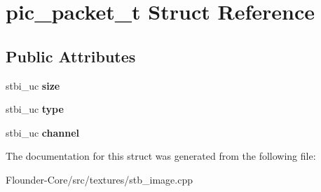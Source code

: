 \hypertarget{structpic__packet__t}{}\section{pic\+\_\+packet\+\_\+t Struct Reference}
\label{structpic__packet__t}
\subsection*{Public Attributes}
\begin{DoxyCompactItemize}
\item 
\mbox{\label{structpic__packet__t_ad33021e40c272a20d89bdcceabb20a71}} 
stbi\+\_\+uc {\bfseries size}
\item 
\mbox{\label{structpic__packet__t_abc346cfdcff43f051830335296f14aaa}} 
stbi\+\_\+uc {\bfseries type}
\item 
\mbox{\label{structpic__packet__t_af64f17c991495f3f3baf6782a253f7cc}} 
stbi\+\_\+uc {\bfseries channel}
\end{DoxyCompactItemize}


The documentation for this struct was generated from the following file\+:\begin{DoxyCompactItemize}
\item 
Flounder-\/\+Core/src/textures/stb\+\_\+image.\+cpp\end{DoxyCompactItemize}
